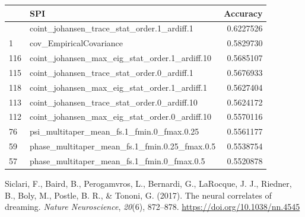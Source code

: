 \documentclass[
  man,
  longtable,
  nolmodern,
  notxfonts,
  notimes,
  colorlinks=true,linkcolor=blue,citecolor=blue,urlcolor=blue]{apa7}
\newlength{\cslhangindent}
\newenvironment{CSLReferences}[2] %
 {\begin{list}{}{%
  \setlength{\itemindent}{0pt}
  \setlength{\leftmargin}{0pt}
  \setlength{\parsep}{0pt}
  \ifodd #1
   \setlength{\leftmargin}{\cslhangindent}
   \setlength{\itemindent}{-1\cslhangindent}
  \fi
  \setlength{\itemsep}{#2\baselineskip}}}
 {\end{list}}
\begin{document}
\begin{table}

{\caption{{Top 10 Names}{\label{tbl-topacc}}}
\vspace{-20pt}}

\begin{longtable}[]{@{}llr@{}}
\toprule\noalign{}
& SPI & Accuracy \\
\midrule\noalign{}
\endhead
\bottomrule\noalign{}
\endlastfoot
119 & coint\_johansen\_trace\_stat\_order.1\_ardiff.1 & 0.6227526 \\
1 & cov\_EmpiricalCovariance & 0.5829730 \\
116 & coint\_johansen\_max\_eig\_stat\_order.1\_ardiff.10 & 0.5685107 \\
115 & coint\_johansen\_trace\_stat\_order.0\_ardiff.1 & 0.5676933 \\
118 & coint\_johansen\_max\_eig\_stat\_order.1\_ardiff.1 & 0.5627404 \\
113 & coint\_johansen\_trace\_stat\_order.0\_ardiff.10 & 0.5624172 \\
112 & coint\_johansen\_max\_eig\_stat\_order.0\_ardiff.10 & 0.5570116 \\
76 & psi\_multitaper\_mean\_fs.1\_fmin.0\_fmax.0.25 & 0.5561177 \\
59 & phase\_multitaper\_mean\_fs.1\_fmin.0.25\_fmax.0.5 & 0.5538754 \\
57 & phase\_multitaper\_mean\_fs.1\_fmin.0\_fmax.0.5 & 0.5520878 \\
\end{longtable}

\end{table}

\label{refs}
\begin{CSLReferences}{1}{0}
Siclari, F., Baird, B., Perogamvros, L., Bernardi, G., LaRocque, J. J.,
Riedner, B., Boly, M., Postle, B. R., \& Tononi, G. (2017). The neural
correlates of dreaming. \emph{Nature Neuroscience}, \emph{20}(6),
872--878. \url{https://doi.org/10.1038/nn.4545}

\end{CSLReferences}
\end{document}
